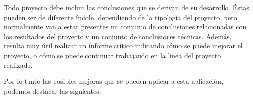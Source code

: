 
Todo proyecto debe incluir las conclusiones que se derivan de su desarrollo.
Éstas pueden ser de diferente índole, dependiendo de la tipología del proyecto,
pero normalmente van a estar presentes un conjunto de conclusiones relacionadas
con los resultados del proyecto y un conjunto de conclusiones técnicas. Además,
resulta muy útil realizar un informe crítico indicando cómo se puede mejorar el
proyecto, o cómo se puede continuar trabajando en la línea del proyecto
realizado. 

Por lo tanto las posibles mejoras que se pueden aplicar a esta aplicación,
podemos destacar las siguientes:%
\begin{itemize}


\end{itemize}
